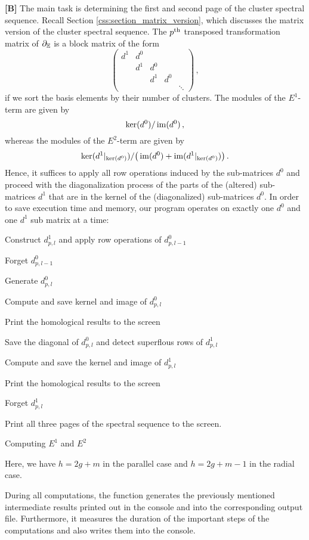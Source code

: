 {\bf [B]} The main task is determining the first and second page of the cluster spectral sequence.
Recall Section \ref{css:section_matrix_version}, which discusses the matrix version of the cluster spectral sequence.
The $p^{\text{th}}$ transposed transformation matrix of $\partial_\mathbb E$ is a block matrix of the form
\[ 
    \begin{pmatrix}
        d^1 & d^0 \\
            & d^1   & d^0 \\
            &       & d^1   & d^0 \\
            &       &       &       & \ddots
    \end{pmatrix} \,,
\]
if we sort the basis elements by their number of clusters.
The modules of the $E^1$-term are given by
\[
    \ker(d^0) / \operatorname{im}(d^0)\,,
\]
whereas the modules of the $E^2$-term are given by
\[
    \ker(d^1|_{\ker(d^0)}) / \big( \operatorname{im}(d^0) + \operatorname{im}(d^1|_{\ker(d^0)}) \big) \,.
\]
Hence, it suffices to apply all row operations induced by the sub-matrices $d^0$ and proceed with the diagonalization process of
the parts of the (altered) sub-matrices $d^1$ that are in the kernel of the (diagonalized) sub-matrices $d^0$.
In order to save execution time and memory, our program operates on exactly one $d^0$ and one $d^1$ sub matrix at a time:

\begin{algorithm}[H]
\DontPrintSemicolon
{}
{
    {
        Construct $d^1_{p,l}$ and apply row operations of $d^0_{p,l-1}$
        
        Forget $d^0_{p,l-1}$
        
        Generate $d^0_{p,l}$
        
        Compute and save kernel and image of $d^0_{p,l}$
        
        Print the homological results to the screen
        
        Save the diagonal of $d^0_{p,l}$ and detect superflous rows of $d^1_{p,l}$
        
        Compute and save the kernel and image of $d^1_{p,l}$
        
        Print the homological results to the screen
        
        Forget $d^1_{p,l}$
    }
}
Print all three pages of the spectral sequence to the screen.
\caption{Computing $E^1$ and $E^2$}
\end{algorithm}

Here, we have $h = 2g + m$ in the parallel case and $h = 2g + m - 1$ in the radial case.

During all computations, the function  generates the previously mentioned intermediate results 
printed out in the console and into the corresponding output file.
Furthermore, it measures the duration of the important steps of the computations 
and also writes them into the console. 
